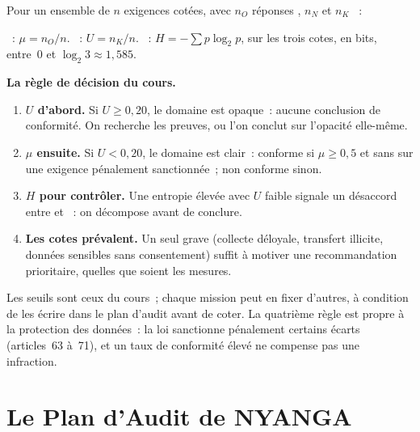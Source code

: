 \begin{boxdef}
Pour un ensemble de $n$ exigences cotées, avec $n_O$ réponses \OUI{}, $n_N$
\NON{} et $n_K$ \NEK{}~:

\smallskip
{}~: $\mu = n_O / n$.
~: $U = n_K / n$.
~: $H = -\sum p \log_2 p$, sur les trois cotes, en bits,
entre~0 et $\log_2 3 \approx 1{,}585$.
\end{boxdef}

\begin{boxprocedure}
\textbf{La règle de décision du cours.}
\begin{enumerate}
    \item \textbf{$U$ d'abord.} Si $U \geq 0{,}20$, le domaine est opaque~:
          aucune conclusion de conformité. On recherche les preuves, ou l'on
          conclut sur l'opacité elle-même.
    \item \textbf{$\mu$ ensuite.} Si $U < 0{,}20$, le domaine est clair~:
          conforme si $\mu \geq 0{,}5$ et sans \NON{} sur une exigence
          pénalement sanctionnée~; non conforme sinon.
    \item \textbf{$H$ pour contrôler.} Une entropie élevée avec $U$ faible
          signale un désaccord entre \OUI{} et \NON{}~: on décompose avant
          de conclure.
    \item \textbf{Les cotes prévalent.} Un seul \NON{} grave (collecte
          déloyale, transfert illicite, données sensibles sans
          consentement) suffit à motiver une recommandation prioritaire,
          quelles que soient les mesures.
\end{enumerate}
\end{boxprocedure}

Les seuils sont ceux du cours~; chaque mission peut en fixer d'autres, à
condition de les écrire dans le plan d'audit avant de coter. La quatrième
règle est propre à la protection des données~: la loi sanctionne
pénalement certains écarts (articles~63 à~71), et un taux de conformité
élevé ne compense pas une infraction.

\section{Le Plan d'Audit de NYANGA}
\label{sec:c03-nyanga}


